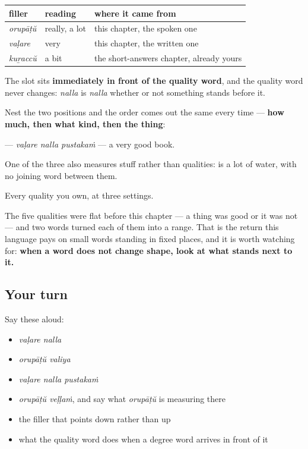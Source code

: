 \begin{grammarlens}[title={Grammar Lens: one slot, three fillers, nothing else moves}]
\noindent
\begin{tabularx}{\linewidth}{@{}>{\raggedright\arraybackslash}X>{\raggedright\arraybackslash}X>{\raggedright\arraybackslash}X@{}}
\toprule
\textbf{filler} & \textbf{reading} & \textbf{where it came from} \\
\midrule
\textbf{\ml{ഒരുപാട്}} \emph{orupāṭŭ} & really, a lot & this chapter, the spoken one \\
\textbf{\ml{വളരെ}} \emph{vaḷare} & very & this chapter, the written one \\
\textbf{\ml{കുറച്ച്}} \emph{kuṟaccŭ} & a bit & the short-answers chapter, already yours \\
\bottomrule
\end{tabularx}

The slot sits \textbf{immediately in front of the quality word}, and the quality word never changes: \emph{nalla} is \emph{nalla} whether or not something stands before it.

Nest the two positions and the order comes out the same every time — \textbf{how much, then what kind, then the thing}:

\textbf{  } — \emph{vaḷare nalla pustakaṁ} — a very good book.

One of the three also measures stuff rather than qualities: \textbf{ } is a lot of water, with no joining word between them.
\end{grammarlens}

\begin{grammarlens}[title={What you've built}]
Every quality you own, at three settings.

The five qualities were flat before this chapter — a thing was good or it was not — and two words turned each of them into a range. That is the return this language pays on small words standing in fixed places, and it is worth watching for: \textbf{when a word does not change shape, look at what stands next to it.}
\end{grammarlens}

\subsection*{Your turn}
Say these aloud:

\begin{itemize}
\raggedright
  \item \emph{vaḷare nalla}
  \item \emph{orupāṭŭ valiya}
  \item \emph{vaḷare nalla pustakaṁ}
  \item \emph{orupāṭŭ veḷḷaṁ}, and say what \emph{orupāṭŭ} is measuring there
  \item the filler that points down rather than up
  \item what the quality word does when a degree word arrives in front of it
\end{itemize}

